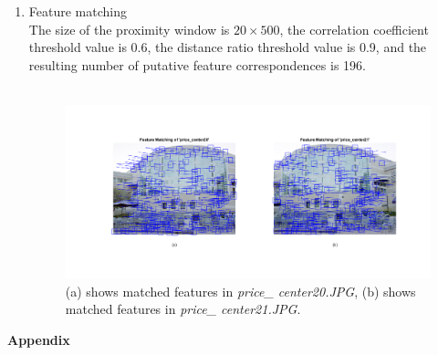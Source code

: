 \documentclass{../../assignment}
\begin{document}
\begin{problemlist}
\begin{enumerate}
\item Feature matching\\
The size of the proximity window is $20\times500$, the correlation coefficient threshold value is 0.6, the distance ratio threshold value is 0.9, and the resulting
number of putative feature correspondences is 196.\\
\\
\begin{figure}[H]
  \includegraphics[width=6in]{FeatureMatch}
\caption{(a) shows matched features in \emph{price\_ center20.JPG}, (b) shows matched features in \emph{price\_ center21.JPG}.}
\end{figure} 

\end{enumerate}
\end{problemlist}

\begin{flushleft}
\large{\textbf{Appendix}}
\end{flushleft}




\end{document}
